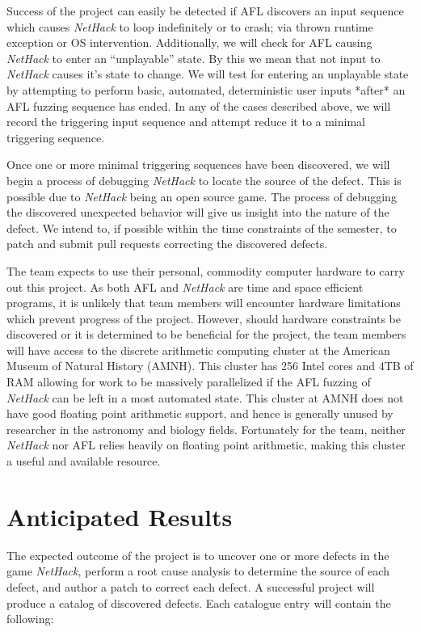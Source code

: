 \documentclass[12pt]{diazessay}
\begin{document}
Success of the project can easily be detected if AFL discovers an input sequence which causes \emph{NetHack} to loop indefinitely or to crash; via thrown runtime exception or OS intervention.
Additionally, we will check for AFL causing \emph{NetHack} to enter an ``unplayable'' state.
By this we mean that not input to \emph{NetHack} causes it's state to change.
We will test for entering an unplayable state by attempting to perform basic, automated, deterministic user inputs *after* an AFL fuzzing sequence has ended.
In any of the cases described above, we will record the triggering input sequence and attempt reduce it to a minimal triggering sequence.

Once one or more minimal triggering sequences have been discovered, we will begin a process of debugging \emph{NetHack} to locate the source of the defect.
This is possible due to \emph{NetHack} being an open source game.
The process of debugging the discovered unexpected behavior will give us insight into the nature of the defect.
We intend to, if possible within the time constraints of the semester, to patch and submit pull requests correcting the discovered defects.

The team expects to use their personal, commodity computer hardware to carry out this project.
As both AFL and \emph{NetHack} are time and space efficient programs, it is unlikely that team members will encounter hardware limitations which prevent progress of the project.
However, should hardware constraints be discovered or it is determined to be beneficial for the project, the team members will have access to the discrete arithmetic computing cluster at the American Museum of Natural History (AMNH).
This cluster has 256 Intel cores and 4TB of RAM allowing for work to be massively parallelized \cite{ClusteringParallel} if the AFL fuzzing of \emph{NetHack} can be left in a most automated state.
This cluster at AMNH does not have good floating point arithmetic \cite{FloatingPointArithmetic} support, and hence is generally unused by researcher in the astronomy and biology fields.
Fortunately for the team, neither \emph{NetHack} nor AFL relies heavily on floating point arithmetic, making this cluster a useful and available resource.



\section*{Anticipated Results}
\label{results}

The expected outcome of the project is to uncover one or more defects in the game \emph{NetHack}, perform a root cause analysis to determine the source of each defect, and author a patch to correct each defect. 
A successful project will produce a catalog of discovered defects. 
Each catalogue entry will contain the following: 
\end{document}
